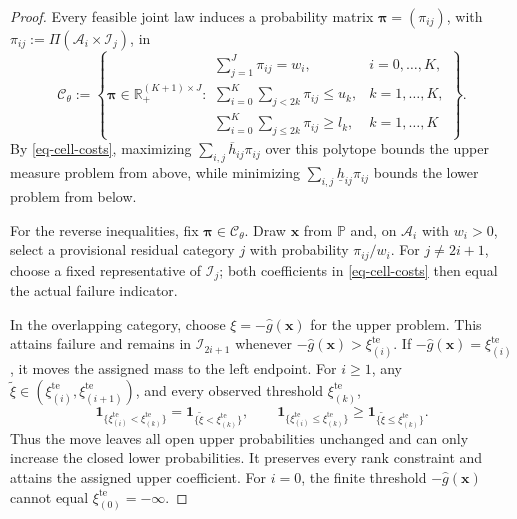 \documentclass[review,11pt,3p,authoryear,nopreprintline]{elsarticle}
\begin{document}
\begin{proof}
  Every feasible joint law induces a probability matrix $\bm\pi=(\pi_{ij})$, with $\pi_{ij}:=\Pi(\mathcal A_i\times \mathcal I_j)$, in
  \begin{equation}
    \mathcal C_\theta:=
    \left\{\bm\pi\in\mathbb R_+^{(K+1)\times J}:
    \begin{array}{ll}
      \displaystyle\sum_{j=1}^J\pi_{ij}=w_i,
        &i=0,\ldots,K,\\[1mm]
      \displaystyle\sum_{i=0}^K\sum_{j<2k}\pi_{ij}\le u_k,
        &k=1,\ldots,K,\\[1mm]
      \displaystyle\sum_{i=0}^K\sum_{j\le2k}\pi_{ij}\ge l_k,
        &k=1,\ldots,K
    \end{array}\right\}.
    \label{eq-cell-mass-polytope}
  \end{equation}
  By \eqref{eq-cell-costs}, maximizing $\sum_{i,j}\overline h_{ij}\pi_{ij}$ over this polytope bounds the upper measure problem from above, while minimizing $\sum_{i,j}\underline h_{ij}\pi_{ij}$ bounds the lower problem from below.

  For the reverse inequalities, fix $\bm\pi\in\mathcal C_\theta$. Draw $\bm x$ from $\mathbb P$ and, on $\mathcal A_i$ with $w_i>0$, select a provisional residual category $j$ with probability $\pi_{ij}/w_i$. For $j\ne2i+1$, choose a fixed representative of $\mathcal I_j$; both coefficients in \eqref{eq-cell-costs} then equal the actual failure indicator.

  In the overlapping category, choose $\xi=-\hat g(\bm x)$ for the upper problem. This attains failure and remains in $\mathcal I_{2i+1}$ whenever $-\hat g(\bm x)>\xi_{(i)}^{\mathrm{te}}$. If $-\hat g(\bm x)=\xi_{(i)}^{\mathrm{te}}$, it moves the assigned mass to the left endpoint. For $i\ge1$, any $\widetilde\xi\in(\xi_{(i)}^{\mathrm{te}},\xi_{(i+1)}^{\mathrm{te}})$, and every observed threshold $\xi_{(k)}^{\mathrm{te}}$,
  \begin{equation}
    \mathbf1_{\{\xi_{(i)}^{\mathrm{te}}<\xi_{(k)}^{\mathrm{te}}\}}=\mathbf1_{\{\widetilde\xi<\xi_{(k)}^{\mathrm{te}}\}},\qquad
    \mathbf1_{\{\xi_{(i)}^{\mathrm{te}}\le \xi_{(k)}^{\mathrm{te}}\}}\ge\mathbf1_{\{\widetilde\xi\le \xi_{(k)}^{\mathrm{te}}\}}.
    \label{eq-endpoint-move}
  \end{equation}
  Thus the move leaves all open upper probabilities unchanged and can only increase the closed lower probabilities. It preserves every rank constraint and attains the assigned upper coefficient. For $i=0$, the finite threshold $-\hat g(\bm x)$ cannot equal $\xi_{(0)}^{\mathrm{te}}=-\infty$.


\end{proof}
\end{document}
